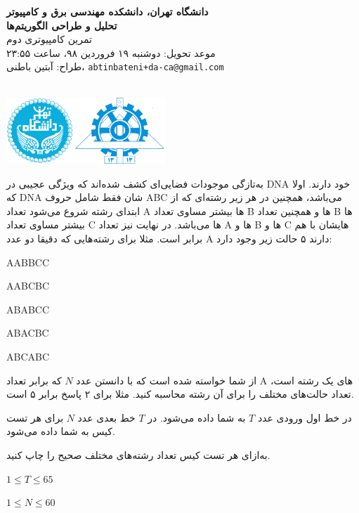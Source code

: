 \documentclass[11.5pt,a4paper,oneside]{article}
\makeatletter
\renewcommand{\contestname}{
دانشگاه تهران، دانشکده مهندسی برق و کامپیوتر \\
تحلیل و طراحی الگوریتم‌ها \\
}
\renewcommand{\contestauthor}{
تمرین کامپیوتری دوم \\ موعد تحویل: دوشنبه ۱۹ فروردین ۹۸، ساعت ۲۳:۵۵ \\ طراح:‌ آبتین باطنی،
\texttt{abtinbateni+da-ca@gmail.com}
}
\makeatother
\begin{document}
{\noindent \Large \bf \contestname}
{\contestauthor}

\begin{flushleft}
\nothing\\[-3.2cm]
\includegraphics[height=2.5cm]{../../../../static/pics/ut-eng.png}
\end{flushleft}

\def\problemCode{DNA}
\def\problemEnglishTitle{Space DNA}
\def\problemFarsiTitle{دی‌ان‌ای فضایی}
\def\timeLimit{$2$ \second}
\def\memLimit{$256$ \megabytes}
\begin{problem}
به‌تازگی موجودات فضایی‌ای کشف شده‌اند که ویژگی عجیبی در DNA خود دارند. اولا که DNA شان فقط شامل حروف ABC می‌باشد، همچنین در هر زیر رشته‌ای که از ابتدای رشته شروع می‌شود تعداد A ها بیشتر مساوی تعداد B ها و همچنین تعداد B ها بیشتر مساوی تعداد C ها می‌باشد. در نهایت نیز تعداد A ها و B ها و C هایشان با هم برابر است. مثلا برای رشته‌هایی که دقیقا دو عدد A دارند ۵ حالت زیر وجود دارد:
\begin{shortitems}
\item
AABBCC
\item
AABCBC
\item
ABABCC
\item
ABACBC
\item
ABCABC
\end{shortitems}
از شما خواسته شده است که با دانستن عدد
$N$
که برابر تعداد A های یک رشته است، تعداد حالت‌های مختلف را برای آن رشته محاسبه کنید. مثلا برای ۲ پاسخ برابر ۵ است.

در خط اول ورودی عدد $T$ به شما داده می‌شود. در $T$ خط بعدی عدد $N$ برای هر تست کیس به شما داده می‌شود.

\outputDescription
به‌ازای هر تست کیس تعداد رشته‌های مختلف صحیح را چاپ کنید.

\constraints
\begin{shortitems}
	\item $1 \le T \le 65$
	\item $1 \le N \le 60$
\end{shortitems}

\sampleIO

\begin{example}
%
\end{example}

\end{problem}
\end{document}
